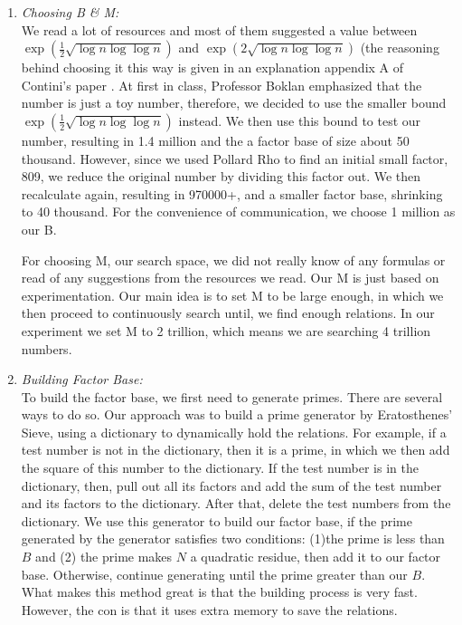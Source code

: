 \documentclass[12pt]{article} %
\newcommand{\itemgap}[1][2]{\vspace{#1mm}}
\begin{document}
	
	\renewcommand\labelenumi{\Roman{enumi}}
	\begin{enumerate}
		\item \textit{Choosing B \& M:} \itemgap
		\\ We read a lot of resources and most of them suggested a value between $\exp{(\frac{1}{2}\sqrt{\log{n}\log{\log{n}}})}$ and $\exp{(2\sqrt{\log{n}\log{\log{n}}})}$ (the reasoning behind choosing it this way is given in an explanation appendix A of Contini's paper \cite{contini}. At first in class, Professor Boklan emphasized that the number is just a toy number, therefore, we decided to use the smaller bound $\exp{(\frac{1}{2}\sqrt{\log{n}\log{\log{n}}})}$ instead. We then use this bound to test our number, resulting in 1.4 million and the a factor base of size about 50 thousand. However, since we used Pollard Rho to find an initial small factor, 809, we reduce the original number by dividing this factor out. We then recalculate again, resulting in 970000+, and a smaller factor base, shrinking to 40 thousand. For the convenience of communication, we choose 1 million as our B. 
		
		For choosing M, our search space, we did not really know of any formulas or read of any suggestions from the resources we read. Our M is just based on experimentation. Our main idea is to set M to be large enough, in which we then proceed to continuously search until, we find enough relations. In our experiment we set M to 2 trillion, which means we are searching 4 trillion numbers.
		
		\item \textit{Building Factor Base:} \itemgap
		\\ To build the factor base, we first need to generate primes. There are several ways to do so. Our approach was to build a prime generator by Eratosthenes' Sieve, using a dictionary to dynamically hold the relations. For example, if a test number is not in the dictionary, then it is a prime, in which we then add the square of this number to the dictionary. If the test number is in the dictionary, then, pull out all its factors and add the sum of the test number and its factors to the dictionary. After that, delete the test numbers from the dictionary. We use this generator to build our factor base, if the prime generated by the generator satisfies two conditions: (1)the prime is less than $B$ and (2) the prime makes $N$ a quadratic residue, then add it to our factor base. Otherwise, continue generating until the prime greater than our $B$. What makes this method great is that the building process is very fast. However, the con is that it uses extra memory to save the relations.
		

\end{enumerate}
\end{document}
